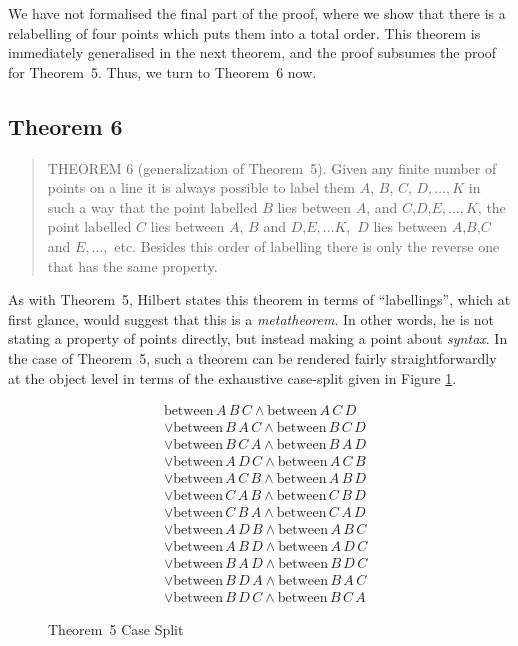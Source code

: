 \documentclass{article}
\newcommand{\between}[3]{\text{between}\,#1\,#2\,#3}
\newcommand{\fourbet}[4]{\between{#1}{#2}{#3}\wedge\between{#1}{#3}{#4}}
\begin{document}
We have not formalised the final part of the proof, where we show that there is a relabelling of four points which puts them into a total order. This theorem is immediately generalised in the next theorem, and the proof subsumes the proof for Theorem~5. Thus, we turn to Theorem~6 now.

\subsection{Theorem 6}\label{sec:Theorem6}
\begin{quote}THEOREM 6 (generalization of Theorem~5). Given any finite number of points on a line it is always possible to label them $A$, $B$, $C$, $D, \ldots, K$ in such a way that the point labelled $B$ lies between $A$, and $C$,$D$,$E, \ldots, K$, the point labelled $C$ lies between $A$, $B$ and $D$,$E,\ldots K,$ $D$ lies between $A$,$B$,$C$ and $E, \ldots,$ etc. Besides this order of labelling there is only the reverse one that has the same property.
\end{quote}
As with Theorem~5, Hilbert states this theorem in terms of ``labellings'', which at first glance, would suggest that this is a \emph{metatheorem}. In other words, he is not stating a property of points directly, but instead making a point about \emph{syntax}. In the case of Theorem~5, such a theorem can be rendered fairly straightforwardly at the object level in terms of the exhaustive case-split given in Figure \ref{fig:Theorem5CasesFormalised}.

\begin{figure}
  \begin{align*}
    &\fourbet{A}{B}{C}{D}\\
    &\vee\fourbet{B}{A}{C}{D}\\
    &\vee\fourbet{B}{C}{A}{D}\\
    &\vee\fourbet{A}{D}{C}{B}\\
    &\vee\fourbet{A}{C}{B}{D}\\
    &\vee\fourbet{C}{A}{B}{D}\\
    &\vee\fourbet{C}{B}{A}{D}\\
    &\vee\fourbet{A}{D}{B}{C}\\
    &\vee\fourbet{A}{B}{D}{C}\\
    &\vee\fourbet{B}{A}{D}{C}\\
    &\vee\fourbet{B}{D}{A}{C}\\
    &\vee\fourbet{B}{D}{C}{A}
  \end{align*}
\caption{Theorem~5 Case Split}
\label{fig:Theorem5CasesFormalised}
\end{figure}
\end{document}
